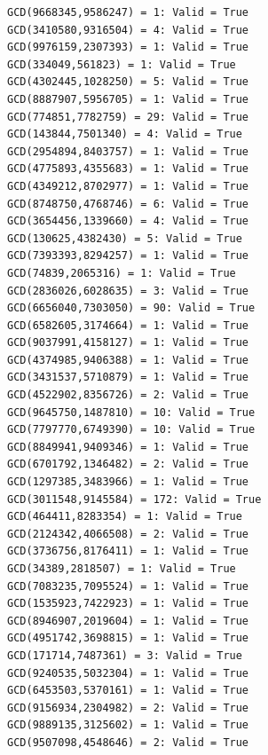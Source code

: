 \documentclass{article}
\begin{document}
\begin{enumerate}
\begin{enumerate}
\begin{lstlisting}
GCD(9668345,9586247) = 1: Valid = True
GCD(3410580,9316504) = 4: Valid = True
GCD(9976159,2307393) = 1: Valid = True
GCD(334049,561823) = 1: Valid = True
GCD(4302445,1028250) = 5: Valid = True
GCD(8887907,5956705) = 1: Valid = True
GCD(774851,7782759) = 29: Valid = True
GCD(143844,7501340) = 4: Valid = True
GCD(2954894,8403757) = 1: Valid = True
GCD(4775893,4355683) = 1: Valid = True
GCD(4349212,8702977) = 1: Valid = True
GCD(8748750,4768746) = 6: Valid = True
GCD(3654456,1339660) = 4: Valid = True
GCD(130625,4382430) = 5: Valid = True
GCD(7393393,8294257) = 1: Valid = True
GCD(74839,2065316) = 1: Valid = True
GCD(2836026,6028635) = 3: Valid = True
GCD(6656040,7303050) = 90: Valid = True
GCD(6582605,3174664) = 1: Valid = True
GCD(9037991,4158127) = 1: Valid = True
GCD(4374985,9406388) = 1: Valid = True
GCD(3431537,5710879) = 1: Valid = True
GCD(4522902,8356726) = 2: Valid = True
GCD(9645750,1487810) = 10: Valid = True
GCD(7797770,6749390) = 10: Valid = True
GCD(8849941,9409346) = 1: Valid = True
GCD(6701792,1346482) = 2: Valid = True
GCD(1297385,3483966) = 1: Valid = True
GCD(3011548,9145584) = 172: Valid = True
GCD(464411,8283354) = 1: Valid = True
GCD(2124342,4066508) = 2: Valid = True
GCD(3736756,8176411) = 1: Valid = True
GCD(34389,2818507) = 1: Valid = True
GCD(7083235,7095524) = 1: Valid = True
GCD(1535923,7422923) = 1: Valid = True
GCD(8946907,2019604) = 1: Valid = True
GCD(4951742,3698815) = 1: Valid = True
GCD(171714,7487361) = 3: Valid = True
GCD(9240535,5032304) = 1: Valid = True
GCD(6453503,5370161) = 1: Valid = True
GCD(9156934,2304982) = 2: Valid = True
GCD(9889135,3125602) = 1: Valid = True
GCD(9507098,4548646) = 2: Valid = True    
        \end{lstlisting}
    \end{enumerate}
  \end{enumerate}  %
\end{document}
